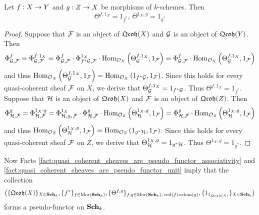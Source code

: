 \begin{fact}\label{fact:quasi_coherent_sheaves_are_pseudo_functor_unit}
Let $f:X\rightarrow Y$ and $g:Z\rightarrow X$ be morphisms of $k$-schemes. Then
$$\Theta^{f,1_X} = 1_{f^*},\,\Theta^{1_X,g} = 1_{g^*}$$
\end{fact}
\begin{proof}
Suppose that ${\mathcal F}$ is an object of $\mathfrak{Qcoh}(X)$ and ${\mathcal G}$ is an object of $\mathfrak{Qcoh}(Y)$. Then
$$\Phi^{f}_{{\mathcal G},{\mathcal F}} = \Phi^{f\cdot 1_X}_{{\mathcal G},{\mathcal F}} = \Phi^f_{{\mathcal G},{\mathcal F}} \cdot \Phi^{1_X}_{f^*{\mathcal G},{\mathcal F}} \cdot \mathrm{Hom}_{{\mathcal O}_X}\left(\Theta^{f,1_X}_{{\mathcal G}},1_{{\mathcal F}}\right) = \Phi^f_{{\mathcal G},{\mathcal F}} \cdot \mathrm{Hom}_{{\mathcal O}_X}\left(\Theta^{f,1_X}_{{\mathcal G}},1_{{\mathcal F}}\right)$$
and thus $\mathrm{Hom}_{{\mathcal O}_X}\left(\Theta^{f,1_X}_{{\mathcal G}},1_{{\mathcal F}}\right) = \mathrm{Hom}_{{\mathcal O}_X}\left(1_{f^*{\mathcal G}},1_{{\mathcal F}}\right)$. Since this holds for every quasi-coherent sheaf ${\mathcal F}$ on $X$, we derive that $\Theta^{f,1_X}_{{\mathcal G}} = 1_{f^*{\mathcal G}}$. Thus $\Theta^{f,1_X} = 1_{f^*}$.\\
Suppose that ${\mathcal H}$ is an object of $\mathfrak{Qcoh}(X)$ and ${\mathcal F}$ is an object of $\mathfrak{Qcoh}(Z)$. Then
$$\Phi^g_{{\mathcal H},{\mathcal F}} = \Phi^{1_X\cdot g}_{{\mathcal H},{\mathcal F}} = \Phi^{1_X}_{{\mathcal H},g_*{\mathcal F}} \cdot \Phi^g_{{\mathcal H},{\mathcal F}}\cdot \mathrm{Hom}_{{\mathcal O}_Z}\left(\Theta^{1_X,g}_{{\mathcal H}},1_{{\mathcal F}}\right) = \Phi^g_{{\mathcal H},{\mathcal F}}\cdot \mathrm{Hom}_{{\mathcal O}_Z}\left(\Theta^{1_X,g}_{{\mathcal H}},1_{{\mathcal F}}\right)$$
and thus $\mathrm{Hom}_{{\mathcal O}_Z}\left(\Theta^{1_X,g}_{{\mathcal H}},1_{{\mathcal F}}\right) = \mathrm{Hom}_{{\mathcal O}_Z}\left(1_{g^*{\mathcal H}} ,1_{{\mathcal F}}\right)$. Since this holds for every quasi-coherent sheaf ${\mathcal F}$ on $Z$, we derive that $\Theta^{1_X,g}_{{\mathcal H}} = 1_{g^*{\mathcal H}}$. Thus $\Theta^{1_X,g} = 1_{g^*}$.
\end{proof}
\noindent
Now Facts \ref{fact:quasi_coherent_sheaves_are_pseudo_functor_associativity} and \ref{fact:quasi_coherent_sheaves_are_pseudo_functor_unit} imply that the collection
$$\big(\{\mathfrak{Qcoh}(X)\}_{X\in \mathbf{Sch}_k},\{f^*\}_{f\in \mathrm{Mor}(\mathbf{Sch}_k)},\{\Theta^{f,g}\}_{f,g\in \mathrm{Mor}(\mathbf{Sch}_k),\,\mathrm{cod}(f)=\mathrm{dom}(g)},\{1_{1_{\mathfrak{Qcoh}(X)}}\}_{X\in \mathbf{Sch}_k}\big)$$
forms a pseudo-functor on $\mathbf{Sch}_k$.


